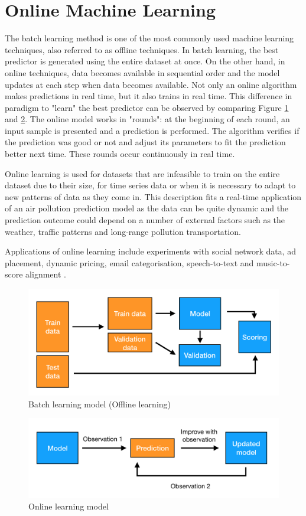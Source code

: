 \section{Online Machine Learning}
The batch learning method is one of the most commonly used machine learning techniques, also referred to as offline techniques. In batch learning, the best predictor is generated using the entire dataset at once. On the other hand, in online techniques, data becomes available in sequential order and the model updates at each step when data becomes available. Not only an online algorithm makes predictions in real time, but it also trains in real time. This difference in paradigm to "learn" the best predictor can be observed by comparing Figure \ref{fig:batch} and \ref{fig:online}. The online model works in "rounds": at the beginning of each round, an input sample is presented and a prediction is performed. The algorithm verifies if the prediction was good or not and adjust its parameters to fit the prediction better next time. These rounds occur continuously in real time.

Online learning is used for datasets that are infeasible to train on the entire dataset due to their size, for time series data or when it is necessary to adapt to new patterns of data as they come in. This description fits a real-time application of an air pollution prediction model as the data can be quite dynamic and the prediction outcome could depend on a number of external factors such as the weather, traffic patterns and long-range pollution transportation.

Applications of online learning include experiments with social network data, ad placement, dynamic pricing, email categorisation, speech-to-text and music-to-score alignment \cite{mit_course}\cite{applications}.

\begin{figure}[H]
\centering
\includegraphics[width=.9\textwidth]{images/batch_learning.png}
\caption{Batch learning model (Offline learning)} \label{fig:batch}
\end{figure}

\begin{figure}[H]
\centering
\includegraphics[width=.9\textwidth]{images/online_learning.png}
\caption{Online learning model} \label{fig:online}
\end{figure}



